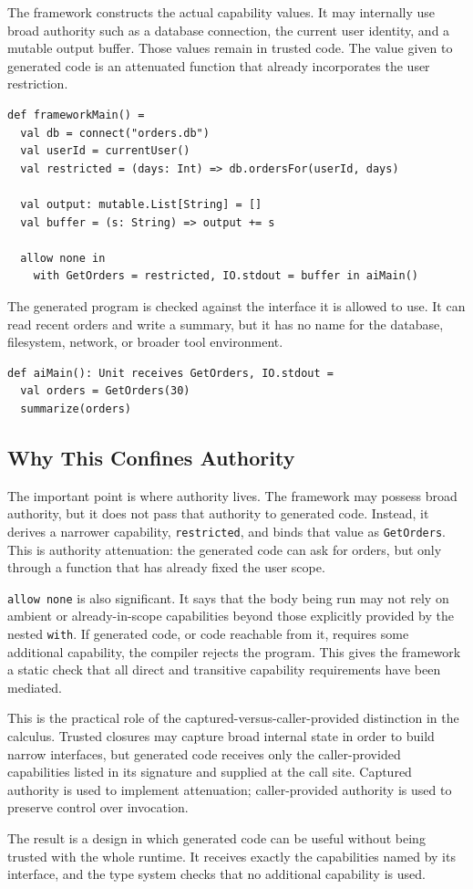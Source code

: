 The framework constructs the actual capability values. %
It may internally use broad authority such as a database connection, the current
user identity, and a mutable output buffer. %
Those values remain in trusted code. %
The value given to generated code is an attenuated function that already
incorporates the user restriction. %

\begin{lstlisting}[style=pseudo]
def frameworkMain() =
  val db = connect("orders.db")
  val userId = currentUser()
  val restricted = (days: Int) => db.ordersFor(userId, days)

  val output: mutable.List[String] = []
  val buffer = (s: String) => output += s

  allow none in
    with GetOrders = restricted, IO.stdout = buffer in aiMain()
\end{lstlisting}

The generated program is checked against the interface it is allowed to use. %
It can read recent orders and write a summary, but it has no name for the
database, filesystem, network, or broader tool environment. %

\begin{lstlisting}[style=pseudo]
def aiMain(): Unit receives GetOrders, IO.stdout =
  val orders = GetOrders(30)
  summarize(orders)
\end{lstlisting}

\subsection{Why This Confines Authority}

The important point is where authority lives. %
The framework may possess broad authority, but it does not pass that authority
to generated code. %
Instead, it derives a narrower capability, \texttt{restricted}, and binds that
value as \texttt{GetOrders}. %
This is authority attenuation: the generated code can ask for orders, but only
through a function that has already fixed the user scope. %

\texttt{allow none} is also significant. %
It says that the body being run may not rely on ambient or already-in-scope
capabilities beyond those explicitly provided by the nested \texttt{with}. %
If generated code, or code reachable from it, requires some additional
capability, the compiler rejects the program. %
This gives the framework a static check that all direct and transitive
capability requirements have been mediated. %

This is the practical role of the captured-versus-caller-provided distinction in
the calculus. %
Trusted closures may capture broad internal state in order to build narrow
interfaces, but generated code receives only the caller-provided capabilities
listed in its signature and supplied at the call site. %
Captured authority is used to implement attenuation; caller-provided authority
is used to preserve control over invocation. %

The result is a design in which generated code can be useful without being
trusted with the whole runtime. %
It receives exactly the capabilities named by its interface, and the type system
checks that no additional capability is used. %
